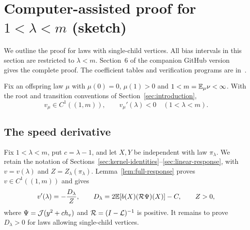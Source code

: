 \section{Computer-assisted proof for \texorpdfstring{$1<\lambda<m$ (sketch)}{1 < lambda < m}}\label{sec:computer}

We outline the proof for laws with single-child vertices. All bias intervals in this section are restricted to $\lambda<m$. Section~6 of the companion GitHub version~\cite{FullVersion} gives the complete proof. The coefficient tables and verification programs are in~\cite{Supplement}.

\begin{theorem}\label{thm:computer}
Fix an offspring law $\mu$ with $\mu(0)=0$, $\mu(1)>0$ and
$1<m=\mathbb E_\mu\nu<\infty$. With the root and transition conventions of
Section~\ref{sec:introduction},
\begin{equation}\label{eq:computer-result}
 v_\mu\in C^1((1,m)),\qquad v_\mu'(\lambda)<0\quad(1<\lambda<m).
\end{equation}
\end{theorem}

\subsection{The speed derivative}
Fix $1<\lambda<m$, put $c=\lambda-1$, and let $X,Y$ be independent with law $\pi_\lambda$. We retain the notation of Sections~\ref{sec:kernel-identities}--\ref{sec:linear-response}, with $v=v(\lambda)$ and $Z=Z_\lambda(\pi_\lambda)$. Lemma~\ref{lem:full-response} proves $v\in C^1((1,m))$ and gives
\begin{equation}\label{eq:hex-response}
 v'(\lambda)=-\frac{D_\lambda}{Z},\qquad
 D_\lambda=2\mathbb E[b(X)(\mathcal R\Psi)(X)]-C,\qquad Z>0,
\end{equation}
where $\Psi=\mathcal J(y^2+c h_v)$ and $\mathcal R=(I-\mathcal L)^{-1}$ is positive. It remains to prove $D_\lambda>0$ for laws allowing single-child vertices.

